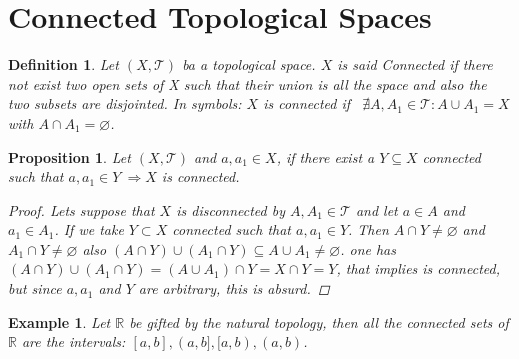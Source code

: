 \documentclass{article}
\newtheorem{proposition}{Proposition}
\newtheorem{definition}{Definition}
\newtheorem{example}{Example}
\begin{document}
        \section*{Connected Topological Spaces}
            \begin{definition}
                Let $(X, \mathcal{T})$ ba a topological space. $X$ is said Connected if there not exist two open sets of X such that their union is all the space and also the two subsets are disjointed.
                In symbols: $X$ is connected if \ $\nexists A, A_1 \in \mathcal{T}: A \cup A_1 = X$ with $A \cap A_1 = \varnothing$. 
            \end{definition}
            \begin{proposition}
                Let $(X,\mathcal{T})$ and $a,a_1 \in X$, if there exist a $Y \subseteq X$ connected such that $a,a_1 \in Y \ \Rightarrow X$ is connected. 
                \begin{proof}
                    Lets suppose that $X$ is disconnected by $A, A_1 \in \mathcal{T}$ and let $a\in A$ and $a_1 \in A_1$. If we take $Y \subset X$ connected such that $a,a_1 \in Y$. Then $A \cap Y \neq \varnothing$ and $A_1 \cap Y \neq \varnothing$ also $(A \cap Y) \cup (A_1 \cap Y) \subseteq A \cup A_1 \neq \varnothing$. one has $(A \cap Y) \cup (A_1 \cap Y) = (A \cup A_1) \cap Y = X \cap Y = Y$, that implies is connected, but since $a, a_1$ and $Y$ are arbitrary, this is absurd.
                \end{proof}
            \end{proposition}
            \begin{example}
                Let $\mathbb{R}$ be gifted by the natural topology, then all the connected sets of $\mathbb{R}$ are the intervals: $[a,b], (a,b], [a,b), (a,b)$.
            \end{example}
\end{document}
